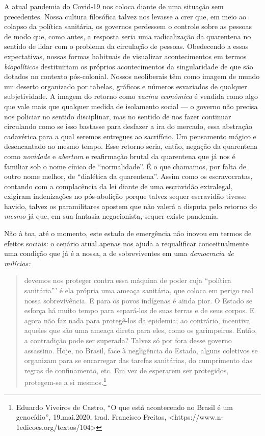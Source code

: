 A atual pandemia do Covid-19 nos coloca diante de uma situação sem
precedentes. Nossa cultura filosófica talvez nos levasse a crer que, em
meio ao colapso da política sanitária, os governos perdessem o controle
sobre as pessoas de modo que, como antes, a resposta seria uma
radicalização da quarentena no sentido de lidar com o problema da
circulação de pessoas. Obedecendo a essas expectativas, nossas formas
habituais de visualizar acontecimentos em termos \emph{biopolíticos}
destituiriam os próprios acontecimentos da singularidade de que são
dotados no contexto pós-colonial. Nossos neoliberais têm como imagem de
mundo um deserto organizado por tabelas, gráficos e números esvaziados
de qualquer subjetividade. A imagem do retorno como \emph{vacina
econômica} é vendida como algo que vale mais que qualquer medida de
isolamento social --- o governo não precisa nos policiar no sentido
disciplinar, mas no sentido de nos fazer continuar circulando como se
isso bastasse para desfazer a ira do mercado, essa abstração cadavérica
para a qual seremos entregues ao sacrifício. Um pensamento mágico e
desencantado ao mesmo tempo. Esse retorno seria, então, negação da
quarentena como \emph{novidade} e \emph{abertura} e reafirmação brutal
da quarentena que já nos é familiar sob o nome cínico de
``normalidade''. É o que chamamos, por falta de outro nome melhor, de
``dialética da quarentena''. Assim como os escravocratas, contando com a
complacência da lei diante de uma escravidão extralegal, exigiram
indenizações no pós-abolição porque talvez sequer escravidão tivesse
havido, talvez os paramilitares apostem que não valerá a disputa pelo
retorno do \emph{mesmo} já que, em sua fantasia negacionista, sequer
existe pandemia.

Não à toa, até o momento, este estado de emergência não inovou em termos
de efeitos sociais: o cenário atual apenas nos ajuda a requalificar
conceitualmente uma condição que já é a nossa, a de sobreviventes em uma
\emph{democracia} \emph{de milícias:}

\begin{quote}
devemos nos proteger contra essa máquina de poder cuja ``política
sanitária''' é ela própria uma ameaça sanitária, que coloca em perigo
real nossa sobrevivência. E para os povos indígenas é ainda pior. O
Estado se esforça há muito tempo para separá-los de suas terras e de
seus corpos. E agora não faz nada para protegê-los da epidemia; ao
contrário, incentiva aqueles que são uma ameaça direta para eles, como
os garimpeiros. Então, a contradição pode ser superada? Talvez só por
fora desse governo assassino. Hoje, no Brasil, face à negligência do
Estado, alguns coletivos se organizam para se encarregar das tarefas
sanitárias, do cumprimento das regras de confinamento, etc. Em vez de
esperarem ser protegidos, protegem-se a si mesmos.\footnote{Eduardo
  Viveiros de Castro, ``O que está acontecendo no Brasil é um
  genocídio'', 19.mai.2020, trad. Francisco Freitas,
  \textless{}https://www.n-1edicoes.org/textos/104\textgreater{}}
\end{quote}

